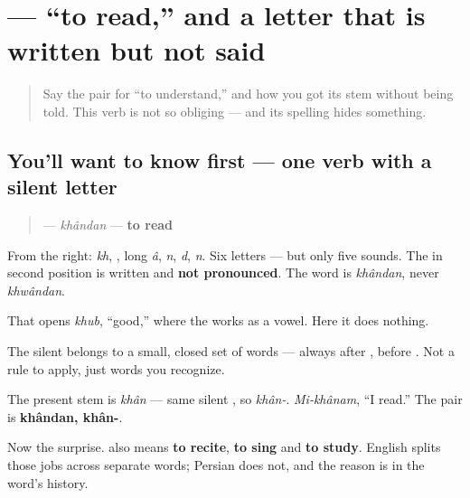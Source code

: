 \section[\texorpdfstring{\fa{خواندن} (khândan)}{خواندن (khândan)}]{ — “to read,” and a letter that is written but not said}

\label{lesson:FA-C07-khandan}



\begin{quote}
Say the pair for “to understand,” and how you got its stem without being told. This verb is not so obliging — and its spelling hides something.
\end{quote}

\subsection*{You'll want to know first — one verb with a silent letter}
\begin{quote}
\textbf{} — \emph{khândan} — \textbf{to read}
\end{quote}

From the right: \textbf{} \emph{kh}, \textbf{}, \textbf{} long \emph{â}, \textbf{} \emph{n}, \textbf{} \emph{d}, \textbf{} \emph{n}. Six letters — but only five sounds. The \textbf{} in second position is written and \textbf{not pronounced}. The word is \emph{khândan}, never \emph{khwândan}.

That \textbf{} opens \emph{khub}, “good,” where the \textbf{} works as a vowel. Here it does nothing.

The silent \textbf{} belongs to a small, closed set of words — always after \textbf{}, before \textbf{}. Not a rule to apply, just words you recognize.

\begin{grammarlens}[title={Grammar Lens: one verb, four English verbs}]
The present stem is \textbf{} \emph{khân} — same silent \textbf{}, so \emph{khân-}. \emph{Mi-khânam}, “I read.” The pair is \textbf{khândan, khân-}.

Now the surprise. \textbf{} also means \textbf{to recite}, \textbf{to sing} and \textbf{to study}. English splits those jobs across separate words; Persian does not, and the reason is in the word's history.
\end{grammarlens}

